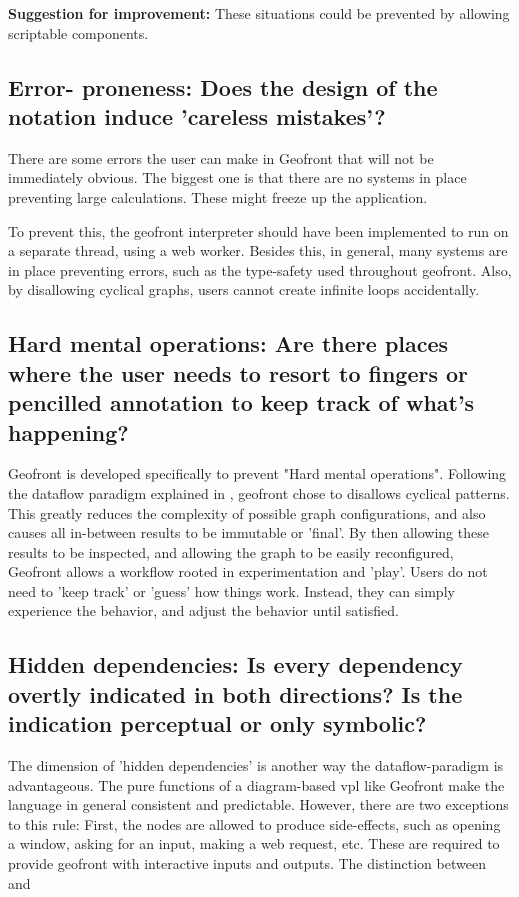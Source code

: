 \textbf{Suggestion for improvement:} These situations could be prevented by allowing scriptable components. 

\subsection*{Error- proneness: Does the design of the notation induce 'careless mistakes'?}

There are some errors the user can make  in Geofront that will not be immediately obvious. 
The biggest one is that there are no systems in place preventing large calculations. 
These might freeze up the application. 

To prevent this, the geofront interpreter should have been implemented to run on a separate thread, using a web worker. 
Besides this, in general, many systems are in place preventing errors, such as the type-safety used throughout geofront.
Also, by disallowing cyclical graphs, users cannot create infinite loops accidentally.

\subsection*{Hard mental operations: Are there places where the user needs to resort to fingers or pencilled annotation to keep track of what's happening?}

Geofront is developed specifically to prevent "Hard mental operations".
Following the dataflow paradigm explained in , geofront chose to disallows cyclical patterns. 
This greatly reduces the complexity of possible graph configurations, and also causes all in-between results to be immutable or 'final'.
By then allowing these results to be inspected, and allowing the graph to be easily reconfigured, Geofront allows a workflow rooted in experimentation and 'play'.
Users do not need to 'keep track' or 'guess' how things work.
Instead, they can simply experience the behavior, and adjust the behavior until satisfied. 



\subsection*{Hidden dependencies: Is every dependency overtly indicated in both directions? Is the indication perceptual or only symbolic?}

The dimension of 'hidden dependencies' is another way the dataflow-paradigm is advantageous. 
The pure functions of a diagram-based vpl like Geofront make the language in general consistent and predictable.
However, there are two exceptions to this rule:
First, the  nodes are allowed to produce side-effects, such as opening a window, asking for an input, making a web request, etc. 
These are required to provide geofront with interactive inputs and outputs.
The distinction between  and \m{}

